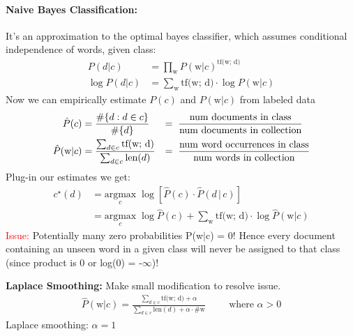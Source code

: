 \documentclass[a4paper,11pt]{article}
\newcommand{\tf}{\text{tf(w; d)}} %
\newcommand{\w}{\text{w}}
\begin{document}
\begin{multicols}{2}
\paragraph{Naive Bayes Classification:}
It's an approximation to the optimal bayes classifier, which assumes conditional independence of words, given class:
\begin{align*}
  P(d | c) &= \prod_{\w} P(\w | c)^{\tf} \\
  \log P(d | c) &= \sum_{\w} \tf \cdot \log P(\w | c)
\end{align*}
Now we can empirically estimate $P(c)$ and $P(\w | c)$ from labeled data
\begin{align*}
  \hat{P}(c) &= \frac{\# \{d : d \in c \}}{\# \{ d \}} &=& \hspace{0.2cm} \frac{\text{num documents in class}}{\text{num documents in collection}}\\
  \hat{P}(\w | c) &= \frac{\sum_{d \in c} \tf}{\sum_{d \in c} \text{len}(d)} &=& \hspace{0.2cm}  \frac{\text{num word occurrences in class}}{\text{num words in collection}} \\
\end{align*}
Plug-in our estimates we get:
\begin{align*}
  c^{\star}(d) &= \underset{c}{\text{argmax}} \; \log \left[ \hat{P}(c) \cdot  \hat{P}(d \, | \, c) \right] \\
               &= \underset{c}{\text{argmax}} \; \log \hat{P}(c) + \sum_{\w} \tf \cdot \log \hat{P}(\w | c)
\end{align*}
\textcolor{red}{Issue:} Potentially many zero probabilities P(w$|$c) = 0! Hence every document containing an unseen word in a given class will never be assigned to that class (since product is 0 or log(0) = -$\infty$)!

\textbf{Laplace Smoothing:} Make small modification to resolve issue.
\begin{align*}
  \hat{P}(\w | c) = \frac{\sum_{d \in c} \tf + \alpha}{\sum_{d \in c} \text{len}(d) + \alpha \cdot \# \w} \hspace{1cm} \text{where } \alpha > 0
\end{align*}
Laplace smoothing: $\alpha = 1$


\end{multicols}
\end{document}

